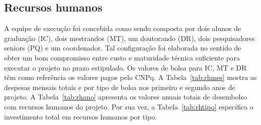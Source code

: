 \subsection{Recursos humanos}
A equipe de execução foi concebida como sendo composta por dois alunos de graduação (IC), dois mestrandos (MT), um doutorando (DR), dois pesquisadores seniors (PQ) e um coordenador. Tal configuração foi elaborada no sentido de obter um bom compromisso entre custo e maturidade técnica suficiente para executar o projeto no prazo estipulado. Os valores de bolsa para IC, MT e DR têm como referência os valores pagos pelo CNPq. A Tabela~\ref{tab:rhmes} mostra as despesas mensais totais e por tipo de bolsa nos primeiro e segundo anos de projeto.
A Tabela~\ref{tab:rhano} apresenta os valores anuais totais de desembolso com recursos humanos do projeto.
Por sua vez, a Tabela~\ref{tab:rhtipo} especifica o investimento total em recursos humanos por tipo.

